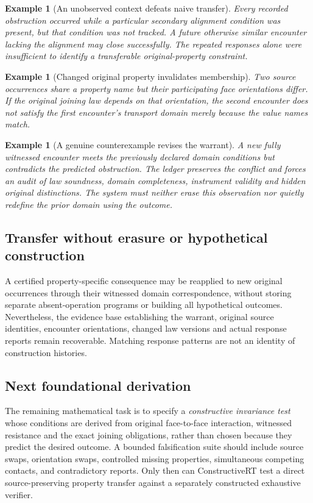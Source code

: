 \documentclass[11pt]{article}
\newtheorem{example}[definition]{Example}
\begin{document}
\begin{example}[An unobserved context defeats naive transfer]
Every recorded obstruction occurred while a particular
secondary alignment condition was present, but that
condition was not tracked. A future otherwise similar
encounter lacking the alignment may close successfully.
The repeated responses alone were insufficient to
identify a transferable original-property constraint.
\end{example}

\begin{example}[Changed original property invalidates membership]
Two source occurrences share a property name but their
participating face orientations differ. If the original
joining law depends on that orientation, the second
encounter does not satisfy the first encounter's
transport domain merely because the value names match.
\end{example}

\begin{example}[A genuine counterexample revises the warrant]
A new fully witnessed encounter meets the previously
declared domain conditions but contradicts the predicted
obstruction. The ledger preserves the conflict and
forces an audit of law soundness, domain completeness,
instrument validity and hidden original distinctions.
The system must neither erase this observation nor
quietly redefine the prior domain using the outcome.
\end{example}

\subsection{Transfer without erasure or hypothetical construction}
A certified property-specific consequence may be
reapplied to new original occurrences through their
witnessed domain correspondence, without storing
separate absent-operation programs or building all
hypothetical outcomes. Nevertheless, the evidence
base establishing the warrant, original source
identities, encounter orientations, changed law
versions and actual response reports remain
recoverable. Matching response patterns are not
an identity of construction histories.

\subsection{Next foundational derivation}
The remaining mathematical task is to specify a
\emph{constructive invariance test} whose conditions
are derived from original face-to-face interaction,
witnessed resistance and the exact joining obligations,
rather than chosen because they predict the desired
outcome. A bounded falsification suite should include
source swaps, orientation swaps, controlled missing
properties, simultaneous competing contacts, and
contradictory reports. Only then can ConstructiveRT
test a direct source-preserving property transfer
against a separately constructed exhaustive verifier.
\end{document}
